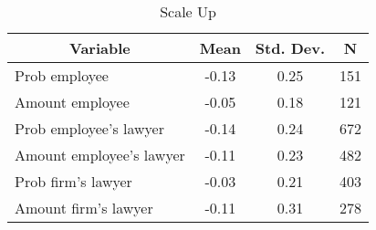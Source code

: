 
\begin{table}[htbp]\centering \caption{Scale Up \label{sumstat}}
\begin{tabular}{l c c  c}\hline\hline
\multicolumn{1}{c}{\textbf{Variable}} & \textbf{Mean}
 & \textbf{Std. Dev.} & \textbf{N}\\ \hline
Prob employee & -0.13 & 0.25  & 151\\
Amount employee & -0.05 & 0.18  & 121\\
Prob employee's lawyer & -0.14 & 0.24  & 672\\
Amount employee's lawyer & -0.11 & 0.23  & 482\\
Prob firm's lawyer & -0.03 & 0.21  & 403\\
Amount firm's lawyer & -0.11 & 0.31  & 278\\
\hline\end{tabular}
\end{table}
